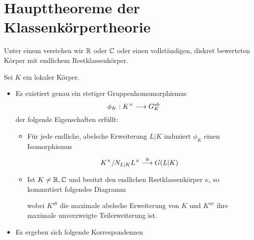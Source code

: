 \documentclass{book}
\begin{document}
\section{Haupttheoreme der Klassenkörpertheorie}
Unter einem  verstehen wir $\mathbb{R}$ oder $\mathbb{C}$ oder einen vollständigen, diskret bewerteten Körper mit endlichem Restklassenkörper.

Sei $K$ ein lokaler Körper.
\begin{itemize}
\item Es existiert genau ein stetiger Gruppenhomomorphismus
\[ \phi_K : K^\times \overset{}{\longrightarrow} G_K^{ab} \]
der folgende Eigenschaften erfüllt:
\begin{itemize}
\item Für jede endliche, abelsche Erweiterung $L|K$ induziert $\phi_K$ einen Isomorphismus
\[ K^\times / N_{L|K} L^\times \overset{\overset{}{\cong}}{\longrightarrow} G(L|K) \]
\item Ist $K\neq \mathbb{R},\mathbb{C}$ und besitzt den endlichen Restklassenkörper $\kappa$, so kommutiert folgendes Diagramm
\begin{center}
\end{center}
wobei $K^{ab}$ die maximale abelsche Erweiterung von $K$ und $K^{uv}$ ihre maximale unverzweigte Teilerweiterung ist.
\end{itemize}
\item Es ergeben sich folgende Korrespondenzen
\begin{center}
\end{center}
\end{itemize}
\end{document}
